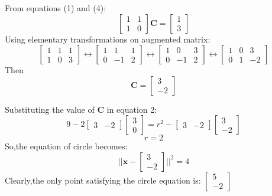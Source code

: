 \documentclass{beamer}
\begin{document}
\begin{frame}
From equations (1) and (4):
\[
\begin{bmatrix}
1 & 1\\
1 & 0
\end{bmatrix}
\boldsymbol{C} = 
\begin{bmatrix}
1\\
3
\end{bmatrix}
\]
Using elementary transformations on augmented matrix:
\[
\begin{bmatrix}
1 & 1 & 1\\
1 & 0 & 3
\end{bmatrix}
\leftrightarrow
\begin{bmatrix}
1 & 1 & 1\\
0 & -1 & 2
\end{bmatrix}
\leftrightarrow
\begin{bmatrix}
1 & 0 & 3\\
0 & -1 & 2
\end{bmatrix}
\leftrightarrow
\begin{bmatrix}
1 & 0 & 3\\
0 & 1 & -2
\end{bmatrix}
\]
Then
\[
\boldsymbol{C} =
\begin{bmatrix}
3\\
-2
\end{bmatrix}
\]
\end{frame}
\begin{frame}
Substituting the value of $\boldsymbol{C}$ in equation 2:
\[
9 - 2
\begin{bmatrix}
3 & -2
\end{bmatrix}
\begin{bmatrix}
3\\
0
\end{bmatrix}
 = r^2 - 
\begin{bmatrix}
3 & -2
\end{bmatrix}
\begin{bmatrix}
3\\
-2
\end{bmatrix}
\]
\[
r=2
\]
So,the equation of circle becomes:
\[
||\boldsymbol{x} - 
\begin{bmatrix}
3\\
-2
\end{bmatrix}
||^2 = 4
\]
Clearly,the only point satisfying the circle equation is:
$\begin{bmatrix}
5\\
-2
\end{bmatrix}$

\end{frame}
\end{document}

